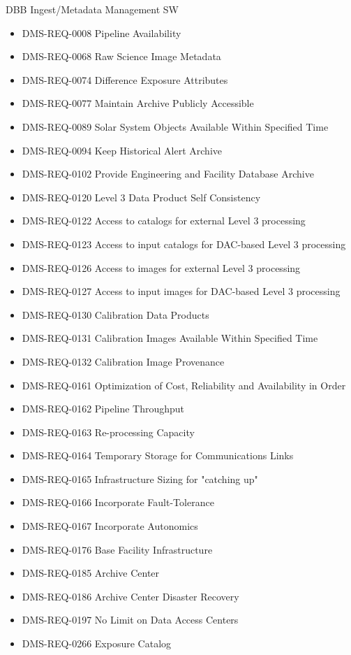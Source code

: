DBB Ingest/Metadata Management SW \begin{itemize}
\item DMS-REQ-0008 Pipeline Availability
\item DMS-REQ-0068 Raw Science Image Metadata
\item DMS-REQ-0074 Difference Exposure Attributes
\item DMS-REQ-0077 Maintain Archive Publicly Accessible
\item DMS-REQ-0089 Solar System Objects Available Within Specified Time
\item DMS-REQ-0094 Keep Historical Alert Archive
\item DMS-REQ-0102 Provide Engineering and Facility Database Archive
\item DMS-REQ-0120 Level 3 Data Product Self Consistency
\item DMS-REQ-0122 Access to catalogs for external Level 3 processing
\item DMS-REQ-0123 Access to input catalogs for DAC-based Level 3 processing
\item DMS-REQ-0126 Access to images for external Level 3 processing
\item DMS-REQ-0127 Access to input images for DAC-based Level 3 processing
\item DMS-REQ-0130 Calibration Data Products
\item DMS-REQ-0131 Calibration Images Available Within Specified Time
\item DMS-REQ-0132 Calibration Image Provenance
\item DMS-REQ-0161 Optimization of Cost, Reliability and Availability in Order
\item DMS-REQ-0162 Pipeline Throughput
\item DMS-REQ-0163 Re-processing Capacity
\item DMS-REQ-0164 Temporary Storage for Communications Links
\item DMS-REQ-0165 Infrastructure Sizing for "catching up"
\item DMS-REQ-0166 Incorporate Fault-Tolerance
\item DMS-REQ-0167 Incorporate Autonomics
\item DMS-REQ-0176 Base Facility Infrastructure
\item DMS-REQ-0185 Archive Center
\item DMS-REQ-0186 Archive Center Disaster Recovery
\item DMS-REQ-0197 No Limit on Data Access Centers
\item DMS-REQ-0266 Exposure Catalog

\end{itemize}
